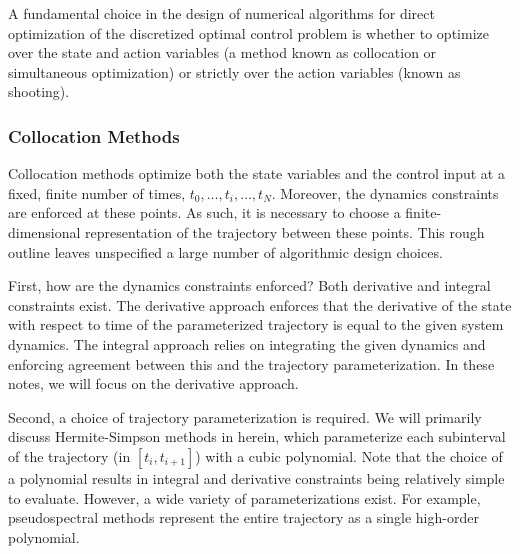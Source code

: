 A fundamental choice in the design of numerical algorithms for direct optimization of the discretized optimal control problem is whether to optimize over the state and action variables (a method known as collocation or simultaneous optimization) or strictly over the action variables (known as shooting).

\subsubsection{Collocation Methods}

Collocation methods optimize both the state variables and the control input at a fixed, finite number of times, $t_0, \ldots, t_i, \ldots, t_N$. Moreover, the dynamics constraints are enforced at these points. As such, it is necessary to choose a finite-dimensional representation of the trajectory between these points. This rough outline leaves unspecified a large number of algorithmic design choices. 

First, how are the dynamics constraints enforced? Both derivative and integral constraints exist. The derivative approach enforces that the derivative of the state with respect to time of the parameterized trajectory is equal to the given system dynamics. The integral approach relies on integrating the given dynamics and enforcing agreement between this and the trajectory parameterization. In these notes, we will focus on the derivative approach. 

Second, a choice of trajectory parameterization is required. We will primarily discuss Hermite-Simpson methods in herein, which parameterize each subinterval of the trajectory (in $[t_i, t_{i+1}]$) with a cubic polynomial. Note that the choice of a polynomial results in integral and derivative constraints being relatively simple to evaluate. However, a wide variety of parameterizations exist. For example, pseudospectral methods represent the entire trajectory as a single high-order polynomial. 

